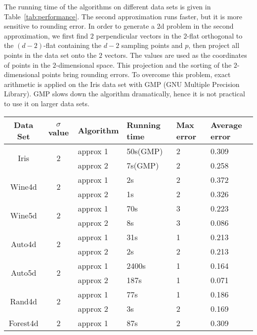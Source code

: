 \documentclass [letterpaper] {article}
\begin{document}
The running time of the algorithms on different data sets is given in Table~\ref{tab:performance}. The second approximation runs faster, but it is more sensitive to rounding error. In order to generate a 2d problem in the second approximation, we first find $2$ perpendicular vectors in the $2$-flat orthogonal to the $(d-2)$-flat containing the $d-2$ sampling points and $p$, then project all points in the data set onto the $2$ vectors. The values are used as the coordinates of points in the $2$-dimensional space. This projection and the sorting of the $2$-dimensional points bring rounding errors. To overcome this problem, exact arithmetic is applied on the Iris data set with GMP (GNU Multiple Precision Library). GMP slows down the algorithm dramatically, hence it is not practical to use it on larger data sets.
\begin{table}[!htb]
  \centering
  \begin{threeparttable}[b]
    \begin{tabular}[center]{|c|c|l|l|l|l|}
      \hline
      Data Set & $\sigma$ value & Algorithm & Running time & Max error\tnote{1} & Average error\tnote{1} \\
      \hline
      \multirow{2}{*}{Iris} & \multirow{2}{*}{2} & approx 1  & 50s(GMP) & 2 & 0.309 \\
      & & approx 2 & 7s(GMP) & 2 & 0.258 \\
      \hline
      \multirow{2}{*}{Wine4d} & \multirow{2}{*}{2} & approx 1 & 2s & 2 & 0.372 \\
      & & approx 2 & 1s & 2 & 0.326 \\
      \hline
      \multirow{2}{*}{Wine5d} & \multirow{2}{*}{2} & approx 1 & 70s & 3 & 0.223 \\
      & & approx 2 & 8s & 3 & 0.086 \\
      \hline
      \multirow{2}{*}{Auto4d} & \multirow{2}{*}{2} & approx 1 & 31s & 1 & 0.213 \\
      & & approx 2 & 2s & 2 & 0.213 \\
      \hline
      \multirow{2}{*}{Auto5d} & \multirow{2}{*}{2} & approx 1 & 2400s & 1 & 0.164 \\
      & & approx 2 & 187s & 1 & 0.071 \\
      \hline
      \multirow{2}{*}{Rand4d} & \multirow{2}{*}{2} & approx 1 & 77s & 1 & 0.186 \\
      & & approx 2 & 3s & 2 & 0.169 \\
      \hline
      \multirow{2}{*}{Forest4d} & \multirow{2}{*}{2} & approx 1 & 87s & 2 & 0.309 \\

\end{tabular}
\end{threeparttable}
\end{table}
\end{document}
